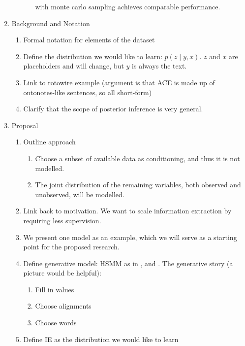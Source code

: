 \documentclass[12pt]{article}
\begin{document}
\begin{enumerate}
\begin{enumerate}
\begin{enumerate}
            with monte carlo sampling achieves comparable performance.
        \end{enumerate}
    \end{enumerate}
\item Background and Notation
    \begin{enumerate}
    \item Formal notation for elements of the dataset
    \item Define the distribution we would like to learn: $p(z\mid y, x)$.
        $z$ and $x$ are placeholders and will change, but $y$ is always the text.
    \item Link to rotowire example
        (argument is that ACE is made up of ontonotes-like sentences, so all short-form)
    \item Clarify that the scope of posterior inference is very general.
    \end{enumerate}
\item Proposal
    \begin{enumerate}
    \item Outline approach
        \begin{enumerate}
        \item Choose a subset of available data as conditioning,
            and thus it is not modelled.
        \item The joint distribution of the remaining variables,
            both observed and unobserved, will be modelled.
        \end{enumerate}
    \item Link back to motivation. We want to scale information extraction
        by requiring less supervision.
    \item We present one model as an example, which we will serve as
        a starting point for the proposed research.
    \item Define generative model: HSMM as in \citep{liang2009semalign},
        and \citep{wiseman2018template}.
        The generative story (a picture would be helpful):
        \begin{enumerate}
        \item Fill in values
        \item Choose alignments
        \item Choose words
        \end{enumerate}
    \item Define IE as the distribution we would like to learn
        \begin{enumerate}

\end{enumerate}
\end{enumerate}
\end{enumerate}
\end{document}
